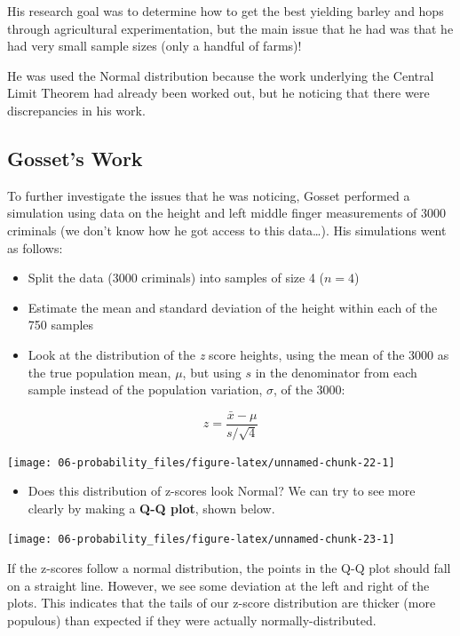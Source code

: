 \documentclass[
]{book}
\providecommand{\tightlist}{%
  \setlength{\itemsep}{0pt}\setlength{\parskip}{0pt}}
\begin{document}
His research goal was to determine how to get the best yielding barley and hops through agricultural experimentation, but the main issue that he had was that he had very small sample sizes (only a handful of farms)!

He was used the Normal distribution because the work underlying the Central Limit Theorem had already been worked out, but he noticing that there were discrepancies in his work.

\hypertarget{gossets-work}{%
\subsection{Gosset's Work}\label{gossets-work}}

To further investigate the issues that he was noticing, Gosset performed a simulation using data on the height and left middle finger measurements of 3000 criminals (we don't know how he got access to this data\ldots). His simulations went as follows:

\begin{itemize}
\tightlist
\item
  Split the data (3000 criminals) into samples of size 4 (\(n=4\))
\item
  Estimate the mean and standard deviation of the height within each of the 750 samples
\item
  Look at the distribution of the \emph{z} score heights, using the mean of the 3000 as the true population mean, \(\mu\), but using \(s\) in the denominator from each sample instead of the population variation, \(\sigma\), of the 3000:
\end{itemize}

\[ z = \frac{\bar{x} - \mu}{s/\sqrt{4}}\]

\begin{center}\texttt{[image: 06-probability\_files/figure-latex/unnamed-chunk-22-1]} \end{center}

\begin{itemize}
\tightlist
\item
  Does this distribution of z-scores look Normal? We can try to see more clearly by making a \textbf{Q-Q plot}, shown below.
\end{itemize}

\begin{center}\texttt{[image: 06-probability\_files/figure-latex/unnamed-chunk-23-1]} \end{center}

If the z-scores follow a normal distribution, the points in the Q-Q plot should fall on a straight line. However, we see some deviation at the left and right of the plots. This indicates that the tails of our z-score distribution are thicker (more populous) than expected if they were actually normally-distributed.
\end{document}
